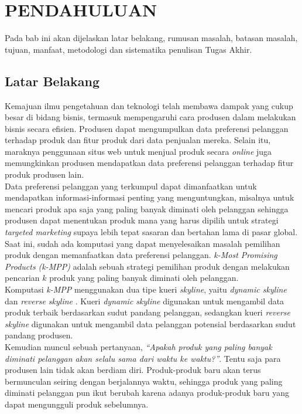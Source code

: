 \chapter{PENDAHULUAN}
\tab Pada bab ini akan dijelaskan latar belakang, rumusan masalah, batasan masalah, tujuan, manfaat, metodologi dan sistematika penulisan Tugas Akhir.

\section{Latar Belakang}
\tab Kemajuan ilmu pengetahuan dan teknologi telah membawa dampak yang cukup besar di bidang bisnis, termasuk mempengaruhi cara produsen dalam melakukan bisnis secara efisien. Produsen dapat mengumpulkan data preferensi pelanggan terhadap produk dan fitur produk dari data penjualan mereka. Selain itu, maraknya penggunaan situs web untuk menjual produk secara \textit{online} juga memungkinkan produsen mendapatkan data preferensi pelanggan terhadap fitur produk produsen lain.\\
\tab Data preferensi pelanggan yang terkumpul dapat dimanfaatkan untuk mendapatkan informasi-informasi penting yang menguntungkan, misalnya untuk mencari produk apa saja yang paling banyak diminati oleh pelanggan sehingga produsen dapat menentukan produk mana yang harus dipilih untuk strategi \textit{targeted marketing} supaya lebih tepat sasaran dan bertahan lama di pasar global.\\
\tab Saat ini, sudah ada komputasi yang dapat menyelesaikan masalah pemilihan
produk dengan memanfaatkan data preferensi pelanggan. \textit{k-Most Promising Products (k-MPP)} \cite{kmpp} adalah sebuah strategi pemilihan produk dengan melakukan pencarian $k$ produk yang paling banyak diminati oleh pelanggan.\\
\tab Komputasi \textit{k-MPP} menggunakan dua tipe kueri \textit{skyline}, yaitu \textit{dynamic skyline} \cite{dynamic-skyline} dan \textit{reverse skyline} \cite{reverse-skyline}. Kueri \textit{dynamic skyline} digunakan untuk mengambil data produk terbaik berdasarkan sudut pandang pelanggan, sedangkan kueri \textit{reverse skyline} digunakan untuk mengambil data pelanggan potensial berdasarkan sudut pandang produsen.\\
\tab Kemudian muncul sebuah pertanyaan, \textit{“Apakah produk yang paling banyak diminati pelanggan akan selalu sama dari waktu ke waktu?”}. Tentu saja para produsen lain tidak akan berdiam diri. Produk-produk baru akan terus bermunculan seiring dengan berjalannya waktu, sehingga produk yang paling diminati pelanggan pun ikut berubah karena adanya produk-produk baru yang dapat mengungguli produk sebelumnya.\\
